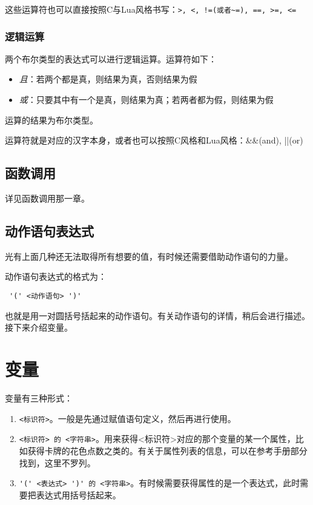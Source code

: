 这些运算符也可以直接按照C与Lua风格书写：\verb|>, <, !=(或者~=), ==, >=, <=|

\subsubsection{逻辑运算}

两个布尔类型的表达式可以进行逻辑运算。运算符如下：

\begin{itemize}
 \item \emph{且}：若两个都是真，则结果为真，否则结果为假
 \item \emph{或}：只要其中有一个是真，则结果为真；若两者都为假，则结果为假
\end{itemize}

运算的结果为布尔类型。

运算符就是对应的汉字本身，或者也可以按照C风格和Lua风格：\&\&(and), ||(or)

\subsection{函数调用}

详见函数调用那一章。

\subsection{动作语句表达式}

光有上面几种还无法取得所有想要的值，有时候还需要借助动作语句的力量。

动作语句表达式的格式为：

\begin{verbatim}
 '(' <动作语句> ')'
\end{verbatim}

也就是用一对圆括号括起来的动作语句。有关动作语句的详情，稍后会进行描述。\\

接下来介绍变量。

\section{变量}

变量有三种形式：

\begin{enumerate}
 \item \verb|<标识符>|。一般是先通过赋值语句定义，然后再进行使用。
 \item \verb|<标识符> 的 <字符串>|。用来获得<标识符>对应的那个变量的某一个属性，比如获得卡牌的花色点数之类的。有关于属性列表的信息，可以在参考手册部分找到，这里不罗列。
 \item \verb|'(' <表达式> ')' 的 <字符串>|。有时候需要获得属性的是一个表达式，此时需要把表达式用括号括起来。
\end{enumerate}

